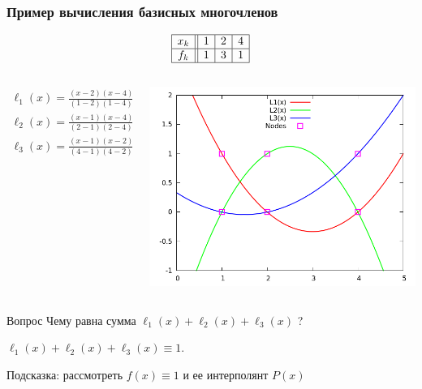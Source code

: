 \documentclass[aspectratio=43,unicode]{beamer}
\begin{document}
\begin{frame}
\frametitle{Пример вычисления базисных многочленов}
	\[
	\begin{array}{|c||c|c|c|}
	\hline
	x_k&1&2&4\\	\hline
	f_k&1&3&1\\	\hline
	\end{array}
	\]
	\begin{columns}[T]
		\begin{column}{0.55\textwidth}
		\vspace{-0.5cm}
		\begin{align*}
		\ell_1(x) = \frac{(x-2)(x-4)}{(1-2)(1-4)} = \frac{1}{3}(x-2)(x-4)\\
		\ell_2(x) = \frac{(x-1)(x-4)}{(2-1)(2-4)} = \frac{1}{2}(x-1)(4-x)\\
		\ell_3(x) = \frac{(x-1)(x-2)}{(4-1)(4-2)} = \frac{1}{6}(x-1)(x-2)
		\end{align*}
		\end{column}
		\begin{column}{0.45\textwidth}
		\centering
		\includegraphics[height=.37\textheight]{l.png}
		\end{column}
	\end{columns}
	\pause

	\begin{block}{Вопрос}
		Чему равна сумма $\ell_1(x) + \ell_2(x) + \ell_3(x)$ ?
		\pause

		$\ell_1(x) + \ell_2(x) + \ell_3(x) \equiv 1$.

		Подсказка: рассмотреть $f(x) \equiv 1$ и ее интерполянт $P(x)$
	\end{block}
\end{frame}
\end{document}
